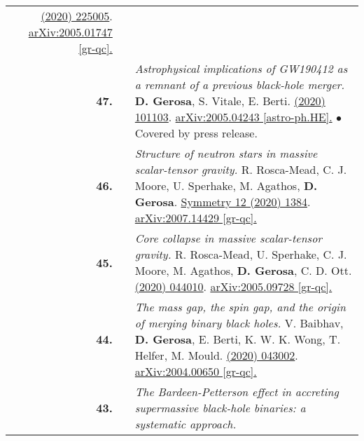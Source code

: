 {\begin{longtable}{rp{0.3cm}p{15.8cm}}
\href{https://iopscience.iop.org/article/10.1088/1361-6382/abb639/meta}{\cqg 37 (2020) 225005}. \href{https://arxiv.org/abs/2005.01747}{arXiv:2005.01747 [gr-qc].}
\vspace{0.09cm}\\
%
\textbf{47.} & & \textit{Astrophysical implications of GW190412 as a remnant of a previous black-hole merger.}
\newline{}
\textbf{D. Gerosa}, S. Vitale, E. Berti.
\newline{}
\href{https://journals.aps.org/prl/abstract/10.1103/PhysRevLett.125.101103}{\prl 125 (2020) 101103}. \href{https://arxiv.org/abs/2005.04243}{arXiv:2005.04243 [astro-ph.HE].}
\newline{}
\textcolor{color1}{$\bullet$} Covered by press release.
\vspace{0.09cm}\\
%
\textbf{46.} & & \textit{Structure of neutron stars in massive scalar-tensor gravity.}
\newline{}
R. Rosca-Mead, C. J. Moore, U. Sperhake, M. Agathos, \textbf{D. Gerosa}.
\newline{}
\href{https://www.mdpi.com/2073-8994/12/9/1384}{Symmetry 12 (2020) 1384}. \href{https://arxiv.org/abs/2007.14429}{arXiv:2007.14429 [gr-qc].}
\vspace{0.09cm}\\
%
\textbf{45.} & & \textit{Core collapse in massive scalar-tensor gravity.}
\newline{}
R. Rosca-Mead, U. Sperhake, C. J. Moore, M. Agathos, \textbf{D. Gerosa}, C. D. Ott.
\newline{}
\href{https://journals.aps.org/prd/abstract/10.1103/PhysRevD.102.044010}{\prd 102 (2020) 044010}. \href{https://arxiv.org/abs/2005.09728}{arXiv:2005.09728 [gr-qc].}
\vspace{0.09cm}\\
%
\textbf{44.} & & \textit{The mass gap, the spin gap, and the origin of merging binary black holes.}
\newline{}
V. Baibhav, \textbf{D. Gerosa}, E. Berti, K. W. K. Wong, T. Helfer, M. Mould.
\newline{}
\href{https://journals.aps.org/prd/abstract/10.1103/PhysRevD.102.043002}{\prd 102 (2020) 043002}. \href{https://arxiv.org/abs/2004.00650}{arXiv:2004.00650 [gr-qc].}
\vspace{0.09cm}\\
%
\textbf{43.} & & \textit{The Bardeen-Petterson effect in accreting supermassive black-hole binaries: a systematic approach.}
\newline{}

\end{longtable}}
